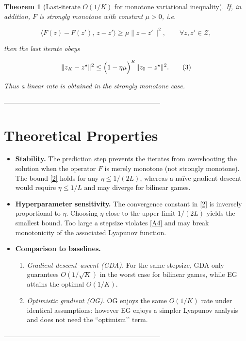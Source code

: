 \documentclass{article}
\newtheorem{theorem}{Theorem}
\begin{document}
\begin{theorem}[Last‑iterate $O(1/K)$ for monotone variational inequality]\label{thm:last}
If, in addition, $F$ is \emph{strongly monotone} with constant $\mu>0$, i.e.  

\[
\langle F(z)-F(z'),\,z-z'\rangle\ge\mu\|z-z'\|^{2},\qquad\forall z,z'\in\mathcal{Z},
\tag{A5}
\]

then the last iterate obeys  

\[
\|z_{K}-z^{\star}\|^{2}\le\Bigl(1-\eta\mu\Bigr)^{K}\|z_{0}-z^{\star}\|^{2}.
\tag{3}
\]

Thus a linear rate is obtained in the strongly monotone case.
\end{theorem}

---------------------------------------------------------------------

\section*{Theoretical Properties}
\begin{itemize}
\item \textbf{Stability.} The prediction step prevents the iterates from overshooting the solution when the operator $F$ is merely monotone (not strongly monotone). The bound \eqref{2} holds for any $\eta\le 1/(2L)$, whereas a naïve gradient descent would require $\eta\le 1/L$ and may diverge for bilinear games.
\item \textbf{Hyperparameter sensitivity.} The convergence constant in \eqref{2} is inversely proportional to $\eta$. Choosing $\eta$ close to the upper limit $1/(2L)$ yields the smallest bound. Too large a stepsize violates \eqref{A4} and may break monotonicity of the associated Lyapunov function.
\item \textbf{Comparison to baselines.}
    \begin{enumerate}
    \item \emph{Gradient descent–ascent (GDA).} For the same stepsize, GDA only guarantees $O(1/\sqrt{K})$ in the worst case for bilinear games, while EG attains the optimal $O(1/K)$.
    \item \emph{Optimistic gradient (OG).} OG enjoys the same $O(1/K)$ rate under identical assumptions; however EG enjoys a simpler Lyapunov analysis and does not need the “optimism’’ term.
    \end{enumerate}
\end{itemize}

---------------------------------------------------------------------
\end{document}
